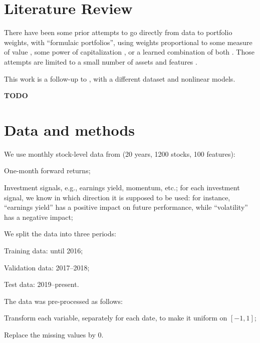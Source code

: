 \documentclass[12pt]{article}
\begin{document}
\clearpage
\section{Literature Review}

There have been some prior attempts to go directly from data to portfolio weights,
with ``formulaic portfolios'', using weights proportional to some measure of value
\cite{arnott_fundamental_2005},
some power of capitalization
\cite{fernholz_stochastic_2002,vervuurt_topics_2015,fernholz_stock_2005,fernholz_diversity-weighted_1998},
or a learned combination of both \cite{samo_stochastic_2016}.
Those attempts are limited to a small number of assets and features \cite{zhang_deep_2020}.

This work is a follow-up to \cite{zoonekynd_end--end_2017}, 
with a different dataset and nonlinear models. 

\textbf{TODO}

\clearpage
\section{Data and methods}

We use monthly stock-level data
from \cite{coqueret_machine_2020} (20 years, 1200 stocks, 100 features):
\begin{compactitem}[--]
\item One-month forward returns;
\item Investment signals, e.g., earnings yield, momentum, etc.;
  for each investment signal, we know in which direction it is supposed to be used:
  for instance, ``earnings yield'' has a positive impact on future performance, while ``volatility'' has a negative impact;
\end{compactitem}

We split the data into three periods: 
\begin{compactitem}[--]
\item Training data: until 2016;
\item Validation data: 2017--2018;
\item Test data: 2019--present.
\end{compactitem}

The data was pre-processed as follows: 
\begin{compactitem}[--]
\item Transform each variable, separately for each date, to make it uniform on $[-1,1]$;
\item Replace the missing values by 0.
\end{compactitem}
\end{document}
